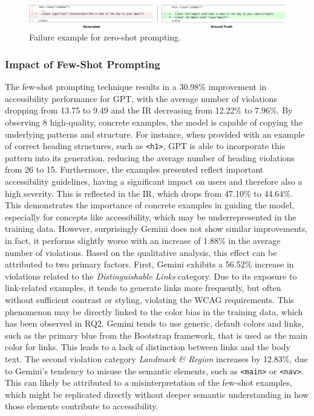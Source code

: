 \begin{figure}
  \centering
  \includegraphics[width=1\linewidth]{figures/zeroshot-example.png}
  \caption{Failure example for zero-shot prompting.}
  \label{fig:zero-shot-example} 
\end{figure}

\subsubsection{Impact of Few-Shot Prompting}
The few-shot prompting technique results in a 30.98\% improvement
in accessibility performance for GPT, with the average number 
of violations dropping from 13.75 to 9.49 and the IR 
decreasing from 12.22\% to 7.96\%. By observing 8 
high-quality, concrete examples, the model is capable of 
copying the underlying patterns and structure. For instance,
when provided with an example of correct heading structures, such 
as \texttt{<h1>}, GPT is able to incorporate this pattern into its
generation, reducing the average number of heading violations 
from 26 to 15. Furthermore, the examples presented 
reflect important accessibility guidelines, having a 
significant impact on users and therefore also a high 
severity. This is reflected in the IR, which drops from 
47.10\% to 44.64\%.
This demonstrates the importance of concrete 
examples in guiding the model, especially for concepts like
accessibility, which may be underrepresented in the training data.\newline
However, surprisingly Gemini does not show similar improvements, in fact, 
it performs slightly worse with an increase of 1.88\% in the average
number of violations. Based on the qualitative analysis, this 
effect can be attributed to two primary factors. First, Gemini 
exhibits a 56.52\% increase in violations related to the 
\emph{Distinguishable Links} category. Due to its exposure 
to link-related examples, it tends to generate links more 
frequently, but often without sufficient contrast or 
styling, violating the WCAG requirements. This phenomenon 
may be directly linked to the color bias in the training data,
which has been observed in RQ2. Gemini tends to use generic, default 
colors and links, such as the primary blue from the Bootstrap framework,
that is used as the main color for links. This leads to 
a lack of distinction between links and the body text.\newline
The second violation category 
\emph{Landmark \& Region} increases by 12.83\%, due to 
Gemini's tendency to misuse the semantic 
elements, such as \texttt{<main>} or \texttt{<nav>}. This 
can likely be attributed to a misinterpretation of 
the few-shot examples, which might be replicated 
directly without deeper semantic understanding in 
how those elements contribute to accessibility.

